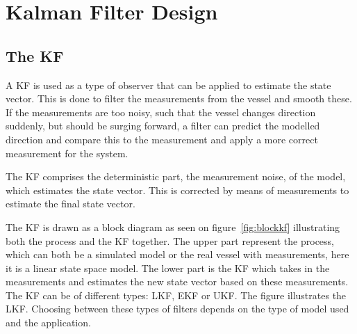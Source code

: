 \section{Kalman Filter Design}
\label{sec:kfdesign}

\subsection{The \acl{KF}}


A \ac{KF} is used as a type of observer that can be applied to estimate the state vector. This is done to filter the measurements from the vessel and smooth these. If the measurements are too noisy, such that the vessel changes direction suddenly, but should be surging forward, a filter can predict the modelled direction and compare this to the measurement and apply a more correct measurement for the system.

The \ac{KF} comprises the deterministic part, the measurement noise, of the model, which estimates the state vector. This is corrected by means of measurements to estimate the final state vector.

The \ac{KF} is drawn as a block diagram as seen on figure~\vref{fig:blockkf} illustrating both the process and the \ac{KF} together. The upper part represent the process, which can both be a simulated model or the real vessel with measurements, here it is a linear state space model. The lower part is the \ac{KF} which takes in the measurements and estimates the new state vector based on these measurements. The \ac{KF} can be of different types: \ac{LKF}, \ac{EKF} or \ac{UKF}. The figure illustrates the \ac{LKF}. Choosing between these types of filters depends on the type of model used and the application. 

